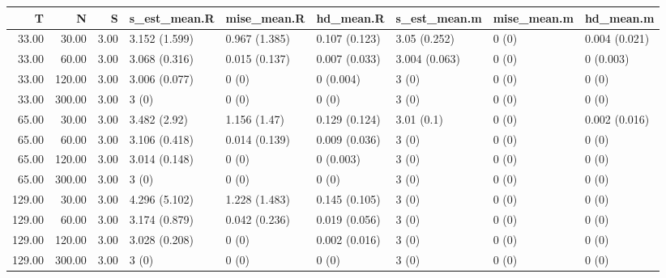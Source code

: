 \begin{table}[ht]
\centering
\begin{tabular}{rrrllllll}
  \hline
T & N & S & s\_est\_mean.R & mise\_mean.R & hd\_mean.R & s\_est\_mean.m & mise\_mean.m & hd\_mean.m \\ 
  \hline
33.00 & 30.00 & 3.00 & 3.152 (1.599) & 0.967 (1.385) & 0.107 (0.123) & 3.05 (0.252) & 0 (0) & 0.004 (0.021) \\ 
  33.00 & 60.00 & 3.00 & 3.068 (0.316) & 0.015 (0.137) & 0.007 (0.033) & 3.004 (0.063) & 0 (0) & 0 (0.003) \\ 
  33.00 & 120.00 & 3.00 & 3.006 (0.077) & 0 (0) & 0 (0.004) & 3 (0) & 0 (0) & 0 (0) \\ 
  33.00 & 300.00 & 3.00 & 3 (0) & 0 (0) & 0 (0) & 3 (0) & 0 (0) & 0 (0) \\ 
  65.00 & 30.00 & 3.00 & 3.482 (2.92) & 1.156 (1.47) & 0.129 (0.124) & 3.01 (0.1) & 0 (0) & 0.002 (0.016) \\ 
  65.00 & 60.00 & 3.00 & 3.106 (0.418) & 0.014 (0.139) & 0.009 (0.036) & 3 (0) & 0 (0) & 0 (0) \\ 
  65.00 & 120.00 & 3.00 & 3.014 (0.148) & 0 (0) & 0 (0.003) & 3 (0) & 0 (0) & 0 (0) \\ 
  65.00 & 300.00 & 3.00 & 3 (0) & 0 (0) & 0 (0) & 3 (0) & 0 (0) & 0 (0) \\ 
  129.00 & 30.00 & 3.00 & 4.296 (5.102) & 1.228 (1.483) & 0.145 (0.105) & 3 (0) & 0 (0) & 0 (0) \\ 
  129.00 & 60.00 & 3.00 & 3.174 (0.879) & 0.042 (0.236) & 0.019 (0.056) & 3 (0) & 0 (0) & 0 (0) \\ 
  129.00 & 120.00 & 3.00 & 3.028 (0.208) & 0 (0) & 0.002 (0.016) & 3 (0) & 0 (0) & 0 (0) \\ 
  129.00 & 300.00 & 3.00 & 3 (0) & 0 (0) & 0 (0) & 3 (0) & 0 (0) & 0 (0) \\ 
   \hline
\end{tabular}
\end{table}
